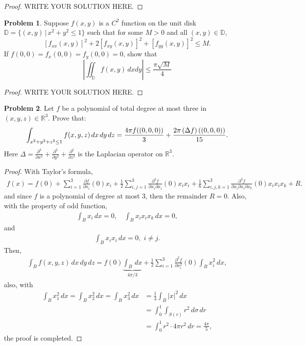 \documentclass[11pt]{article}
\theoremstyle{definition}
\newtheorem{problem}{Problem}
\theoremstyle{definition}
\begin{document}
\begin{proof}
	WRITE YOUR SOLUTION HERE.
\end{proof}


\medskip

\begin{problem}
Suppose $f(x,y)$ is a $C^2$ function on the unit disk $\mathbb{D} = \{(x,y)\,|\,x^2+y^2\leq 1\}$ such that for some $M>0$ and all $(x,y)\in\mathbb{D}$,
$$ \left[f_{xx}(x,y)\right]^2 + 2\left[f_{xy}(x,y)\right]^2 + \left[f_{yy}(x,y)\right]^2 \leq M. $$
If $f(0,0) = f_x(0,0) = f_y(0,0) = 0$, show that
$$ \left\lvert \iint_{\mathbb{D}} f(x,y)\,\mathit{dx}\mathit{dy} \right\rvert \leq \frac{\pi\sqrt{M}}{4} $$
\end{problem}
\begin{proof}
	WRITE YOUR SOLUTION HERE.
\end{proof}


\medskip


\begin{problem}
Let $f$ be a polynomial of total degree at most three in $(x, y, z) \in \mathbb{R}^3$.  Prove that:
$$
\int_{x^2 + y^2 + z^2 \le 1} f(x, y, z)\hspace{1.5pt} dx\hspace{1.5pt}  dy \hspace{1.5pt} dz =
\frac{4\pi f((0, 0, 0)) }{3} +  \frac{2\pi \left(\Delta f\right)((0, 0, 0))}{15}.
$$
Here $\displaystyle \Delta =  \frac{\partial^2}{\partial x^2} + \frac{\partial^2}{\partial y^2} +
\frac{\partial^2}{\partial z^2}$ is the Laplacian operator on $\mathbb{R}^3$.
\end{problem}
\begin{proof}
With Taylor's formula, 
\begin{align*}
    f(x) = f(0) + \sum^3_{i=1} \frac{\partial f}{\partial x_i}(0) x_i + \frac{1}{2} \sum^3_{i,j=1} \frac{\partial^2 f}{\partial x_i \partial x_i}(0)x_i x_i + \frac{1}{6} \sum^3_{i,j,k=1} \frac{\partial^3 f}{\partial x_i \partial x_i \partial x_k}(0)x_i x_i x_k + R.
\end{align*}
and since $f$ is a polynomial of degree at most $3$, then the remainder $R = 0$. Also, with the property of odd function,
\begin{align*}
    \int_B x_i\, dx = 0,\quad \int_B x_i x_i x_k\, dx = 0,
\end{align*}
and
\begin{align*}
    \int_B x_i x_i\, dx = 0,\,\, i\neq j.
\end{align*}
Then, 
\begin{align*}
    \int_B f(x, y, z)\, dx\,dy\,dz = f(0) \underbrace{\int_B\, dx}_{4\pi/3}  + \frac{1}{2} \sum^3_{i=1} \frac{\partial^2 f}{\partial x^2_i}(0) \int_B x_i^2\, dx,
\end{align*}
also, with 
\begin{align*}
    \int_B x_1^2\, dx = \int_B x_2^2\, dx = \int_B x_3^2\, dx & = \frac{1}{3} \int_B |x|^2\, dx \\
    & = \int^1_0 \int_{S(r)} r^2\, d\sigma\, dr \\
    & = \int^1_0 r^2 \cdot 4\pi r^2\, dr = \frac{4\pi}{5},
\end{align*}
the proof is completed. 
\end{proof}
\end{document}
